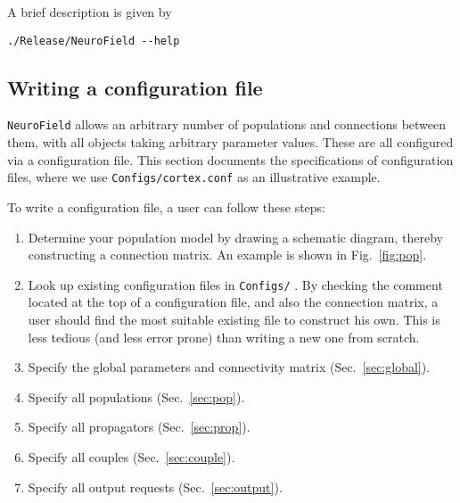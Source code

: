\documentclass[12pt,a4paper]{article}
\newcommand{\type}[1]{ {\small\small\tt #1} }
\begin{document}
A brief description is given by
\begin{lstlisting}
./Release/NeuroField --help
\end{lstlisting}

\subsection{Writing a configuration file}

\type{NeuroField} allows an arbitrary number of populations and connections between them, with all objects taking arbitrary parameter values. These are all configured via a configuration file. This section documents the specifications of configuration files, where we use \type{Configs/cortex.conf} as an illustrative example.

To write a configuration file, a user can follow these steps:
\begin{enumerate}
\item Determine your population model by drawing a schematic diagram, thereby constructing a connection matrix. An example is shown in Fig.~\ref{fig:pop}.
\item Look up existing configuration files in \type{Configs/}. By checking the comment located at the top of a configuration file, and also the connection matrix, a user should find the most suitable existing file to construct his own. This is less tedious (and less error prone) than writing a new one from scratch.
\item Specify the global parameters and connectivity matrix (Sec.~\ref{sec:global}).
\item Specify all populations (Sec.~\ref{sec:pop}).
\item Specify all propagators (Sec.~\ref{sec:prop}).
\item Specify all couples (Sec.~\ref{sec:couple}).
\item Specify all output requests (Sec.~\ref{sec:output}).
\end{enumerate}
\end{document}
